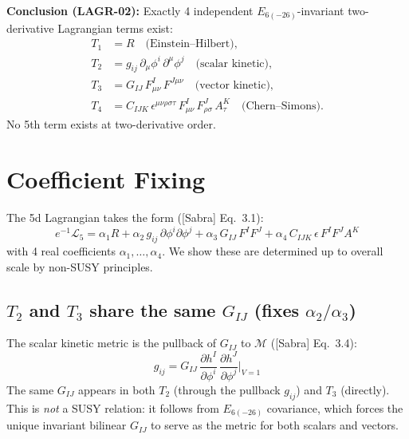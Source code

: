 \textbf{Conclusion (LAGR-02):} Exactly 4 independent $E_{6(-26)}$-invariant
two-derivative Lagrangian terms exist:
\begin{equation}\label{eq:53.5}
  \begin{aligned}
    T_1 &= R \quad\text{(Einstein--Hilbert)}, \\
    T_2 &= g_{ij}\,\partial_\mu\phi^i\,\partial^\mu\phi^j
           \quad\text{(scalar kinetic)}, \\
    T_3 &= G_{IJ}\,F^I_{\mu\nu}\,F^{J\mu\nu}
           \quad\text{(vector kinetic)}, \\
    T_4 &= C_{IJK}\,\epsilon^{\mu\nu\rho\sigma\tau}\,
           F^I_{\mu\nu}\,F^J_{\rho\sigma}\,A^K_\tau
           \quad\text{(Chern--Simons)}.
  \end{aligned}
\end{equation}
No 5th term exists at two-derivative order.



\section{Coefficient Fixing}

The 5d Lagrangian takes the form ([Sabra] Eq.~3.1):
\begin{equation}\label{eq:53.6}
  e^{-1}\mathcal{L}_5 = \alpha_1 R
    + \alpha_2\,g_{ij}\,\partial\phi^i\partial\phi^j
    + \alpha_3\,G_{IJ}\,F^I F^J
    + \alpha_4\,C_{IJK}\,\epsilon\,F^I F^J A^K
\end{equation}
with 4 real coefficients $\alpha_1,\ldots,\alpha_4$. We show these are
determined up to overall scale by non-SUSY principles.

\subsection{$T_2$ and $T_3$ share the same $G_{IJ}$ (fixes $\alpha_2/\alpha_3$)}

The scalar kinetic metric is the pullback of $G_{IJ}$ to $\mathcal{M}$
([Sabra] Eq.~3.4):
$$
  g_{ij} = G_{IJ}\,\frac{\partial h^I}{\partial\phi^i}\,
           \frac{\partial h^J}{\partial\phi^j}\bigg|_{V=1}
$$
The same $G_{IJ}$ appears in both $T_2$ (through the pullback $g_{ij}$) and
$T_3$ (directly). This is \emph{not} a SUSY relation: it follows from
$E_{6(-26)}$ covariance, which forces the unique invariant bilinear $G_{IJ}$
to serve as the metric for both scalars and vectors.

